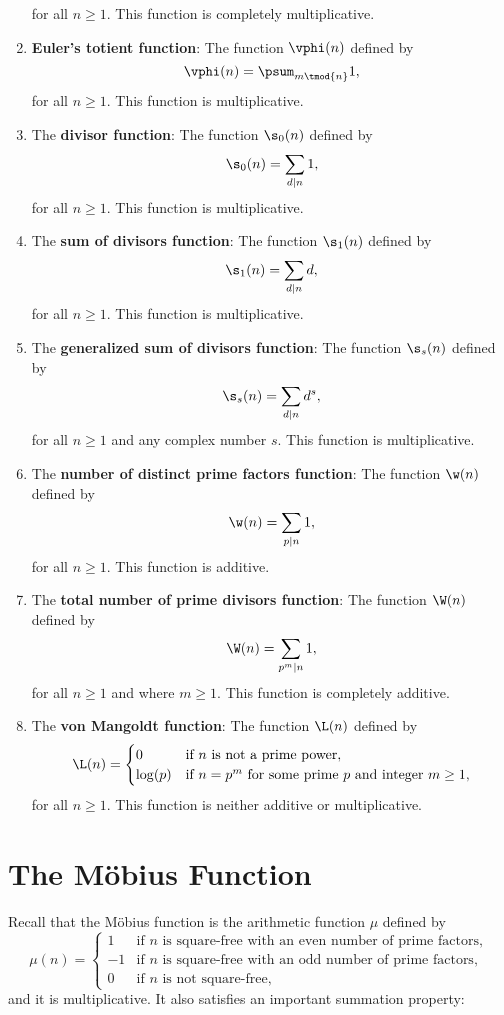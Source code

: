 \begin{enumerate}[label=(\roman*)]
\[      \]
      for all $n \ge 1$. This function is completely multiplicative.
      \item \textbf{Euler's totient function}: The function $\vphi(n)$ defined by
      \[
        \vphi(n) = \psum_{m \tmod{n}}1,
      \]
      for all $n \ge 1$. This function is multiplicative.
      \item The \textbf{divisor function}: The function $\s_{0}(n)$ defined by
      \[
        \s_{0}(n) = \sum_{d \mid n}1,
      \]
      for all $n \ge 1$. This function is multiplicative.
      \item The \textbf{sum of divisors function}: The function $\s_{1}(n)$ defined by
      \[
        \s_{1}(n) = \sum_{d \mid n}d,
      \]
      for all $n \ge 1$. This function is multiplicative.
      \item The \textbf{generalized sum of divisors function}: The function $\s_{s}(n)$ defined by
      \[
        \s_{s}(n) = \sum_{d \mid n}d^{s},
      \]
      for all $n \ge 1$ and any complex number $s$. This function is multiplicative.
      \item The \textbf{number of distinct prime factors function}: The function $\w(n)$ defined by
      \[
        \w(n) = \sum_{p \mid n}1,
      \]
      for all $n \ge 1$. This function is additive.
      \item The \textbf{total number of prime divisors function}: The function $\W(n)$ defined by
      \[
        \W(n) = \sum_{p ^{m} \mid n}1,
      \]
      for all $n \ge 1$ and where $m \ge 1$. This function is completely additive.
      \item The \textbf{von Mangoldt function}: The function $\L(n)$ defined by
      \[
        \L(n) = \begin{cases} 0 & \text{if $n$ is not a prime power}, \\ \log(p) & \text{if $n = p^{m}$ for some prime $p$ and integer $m \ge 1$}, \end{cases}
      \]
      for all $n \ge 1$. This function is neither additive or multiplicative.
    \end{enumerate}
  \section{The M\"obius Function}\label{append:The_Mobius_Function}
    Recall that the M\"obius function is the arithmetic function $\mu$ defined by
    \[
      \mu(n) = \begin{cases} 1 & \text{if $n$ is square-free with an even number of prime factors}, \\ -1 & \text{if $n$ is square-free with an odd number of prime factors}, \\ 0 & \text{if $n$ is not square-free}, \end{cases}
    \]
    and it is multiplicative. It also satisfies an important summation property:

